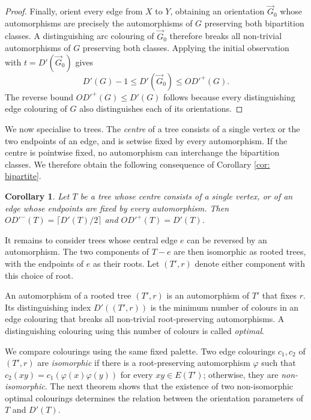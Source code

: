 \documentclass[a4paper,12pt]{elsarticle}
\newtheorem{corollary}[theorem]{Corollary}
\newcommand{\orG}{\ensuremath{\overrightarrow{G}}}
\begin{document}
\begin{proof}
Finally, orient every edge from $X$ to $Y$, obtaining an orientation $\orG_0$ whose automorphisms are precisely the automorphisms of $G$ preserving both bipartition classes. A distinguishing arc colouring of $\orG_0$ therefore breaks all non-trivial automorphisms of $G$ preserving both classes. Applying the initial observation with $t=D'(\orG_0)$ gives
\[
D'(G)-1\leq D'(\orG_0)\leq OD'^+(G).
\]
The reverse bound $OD'^+(G)\leq D'(G)$ follows because every distinguishing edge colouring of $G$ also distinguishes each of its orientations.
\end{proof}

We now specialise to trees. The \emph{centre} of a tree consists of a single vertex or the two endpoints of an edge, and is setwise fixed by every automorphism. If the centre is pointwise fixed, no automorphism can interchange the bipartition classes. We therefore obtain the following consequence of Corollary \ref{cor: bipartite}.

\begin{corollary} \label{cor: most_trees}
Let $T$ be a tree whose centre consists of a single vertex, or of an edge whose endpoints are fixed by every automorphism. Then $OD'^-(T)=\lceil D'(T)/2\rceil$ and $OD'^+(T)=D'(T)$.
\end{corollary}

It remains to consider trees whose central edge $e$ can be reversed by an automorphism. The two components of $T-e$ are then isomorphic as rooted trees, with the endpoints of $e$ as their roots. Let $(T',r)$ denote either component with this choice of root.

An automorphism of a rooted tree $(T',r)$ is an automorphism of $T'$ that fixes $r$. Its distinguishing index $D'((T',r))$ is the minimum number of colours in an edge colouring that breaks all non-trivial root-preserving automorphisms. A distinguishing colouring using this number of colours is called \emph{optimal}.

We compare colourings using the same fixed palette. Two edge colourings $c_1,c_2$ of $(T',r)$ are \emph{isomorphic} if there is a root-preserving automorphism $\varphi$ such that $c_2(xy)=c_1(\varphi(x)\varphi(y))$ for every $xy\in E(T')$; otherwise, they are \emph{non-isomorphic}. The next theorem shows that the existence of two non-isomorphic optimal colourings determines the relation between the orientation parameters of $T$ and $D'(T)$.
\end{document}
